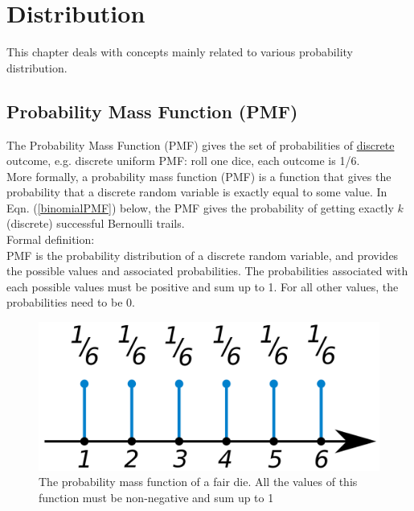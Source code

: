 \graphicspath{%
{chapter1graph/}%
{chapter1graph/bg/}}


\chapter{Distribution}

This chapter deals with concepts mainly related to various probability distribution.

\section{Probability Mass Function (PMF)}

The Probability Mass Function (PMF) gives the set of probabilities of \underline{discrete} outcome, e.g. discrete uniform PMF: roll one dice, each outcome is 1/6. \\

More formally, a probability mass function (PMF) is a function that gives the probability that a discrete random variable is exactly equal to some value. In Eqn. (\ref{binomialPMF}) below, the PMF gives the probability of getting exactly $k$ (discrete) successful Bernoulli trails. \\

Formal definition:\\
PMF is the probability distribution of a discrete random variable, and provides the possible values and associated probabilities. The probabilities associated with each possible values must be positive and sum up to 1. For all other values, the probabilities need to be 0.

\begin{figure}[h!]
\begin{center}
	\includegraphics[scale=0.05]{Fair_dice_probability_distribution.png}
	\caption[]{The probability mass function of a fair die. All the values of this function must be non-negative and sum up to 1}
	\label{fairdiepmf}
	\end{center}
	\end{figure}

